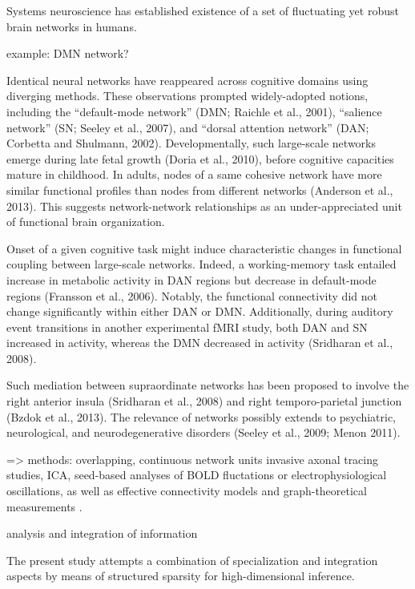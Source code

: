 \documentclass{article} %
\begin{document}
{Systems neuroscience has established existence of a
set of fluctuating yet robust brain networks in humans. 

example: DMN network?


Identical neural networks have reappeared across cognitive domains
using diverging methods. These observations prompted widely-adopted
notions, including the ``default-mode network'' \cite{raichle2001} (DMN; Raichle et al.,
2001), ``salience network'' (SN; Seeley et al., 2007), and ``dorsal
attention network'' (DAN; Corbetta and Shulmann,
2002). Developmentally, such large-scale networks emerge during late
fetal growth (Doria et al., 2010), before cognitive capacities mature
in childhood. In adults, nodes of a same cohesive network have more
similar functional profiles than nodes from different networks
(Anderson et al., 2013).
This
suggests network-network relationships as an under-appreciated unit of
functional brain organization.



Onset of a given cognitive task might induce
characteristic changes in functional coupling between large-scale
networks. Indeed, a working-memory task entailed increase in metabolic
activity in DAN regions but decrease in default-mode regions (Fransson
et al., 2006). Notably, the functional connectivity did not change
significantly within either DAN or DMN. Additionally, during auditory
event transitions in another experimental fMRI study, both DAN and SN
increased in activity, whereas the DMN decreased in activity
(Sridharan et al., 2008). 
 

Such mediation between supraordinate networks
has been proposed to involve the right anterior insula (Sridharan et
al., 2008) and right temporo-parietal junction (Bzdok et al.,
2013).
The relevance of networks
possibly extends to psychiatric, neurological, and neurodegenerative
disorders (Seeley et al., 2009; Menon 2011).

=> methods: overlapping, continuous network units
invasive axonal tracing studies,
ICA,
seed-based analyses of BOLD fluctations or
electrophysiological oscillations,
as well as
effective connectivity models
and
graph-theoretical measurements
\citep{friston03dcm, buzsaki2004neuronal,
beckmann2005, bullmore2009complex, jbabdi2013long}.


analysis and integration of information





The present study attempts a combination of specialization and
integration aspects by means of structured sparsity
for high-dimensional inference.
%

}
\end{document}
